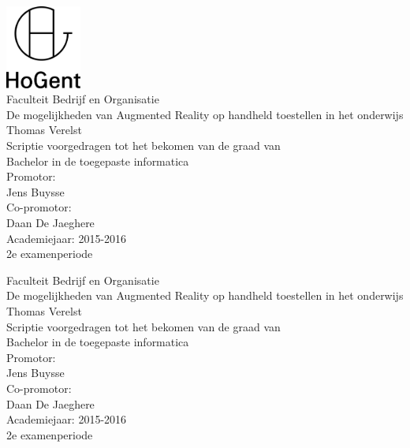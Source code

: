 \documentclass[pdftex,a4paper,12pt,twoside]{report}
\newcommand{\emptypage}{
\newpage
\thispagestyle{empty}
\mbox{}
\newpage
}
\newcommand{\student}{Thomas Verelst}
\newcommand{\promotor}{Jens Buysse}
\newcommand{\copromotor}{Daan De Jaeghere}
\newcommand{\titel}{De mogelijkheden van Augmented Reality op handheld toestellen in het onderwijs}
\newcommand{\faculteit}{Faculteit Bedrijf en Organisatie}
\newcommand{\rapporttype}{Scriptie voorgedragen tot het bekomen van de graad van\\Bachelor in de toegepaste informatica}
\newcommand{\academiejaar}{2015-2016}
\newcommand{\examenperiode}{2e examenperiode}
\begin{document}

\begin{titlepage}
  \begin{center}

    \begingroup
    \rmfamily
    \includegraphics[width=2.5cm]{img/HG-beeldmerk-woordmerk}\\[.5cm]
    \faculteit\\[3cm]
    \titel
    \vfill
    \student\\[3.5cm]
    \rapporttype\\[2cm]
    Promotor:\\
    \promotor\\
    Co-promotor:\\
    \copromotor\\[2.5cm]
    Academiejaar: \academiejaar\\[.5cm]
    \examenperiode
    \endgroup

  \end{center}
  \restoregeometry
\end{titlepage}


\emptypage


\begin{titlepage}
  \begin{center}

    \begingroup
    \rmfamily
    \faculteit\\[3cm]
    \titel
    \vfill
    \student\\[3.5cm]
    \rapporttype\\[2cm]
    Promotor:\\
    \promotor\\
    Co-promotor:\\
    \copromotor\\[2.5cm]
    Academiejaar: \academiejaar\\[.5cm]
    \examenperiode
    \endgroup

  \end{center}
  \restoregeometry
\end{titlepage}
\end{document}
